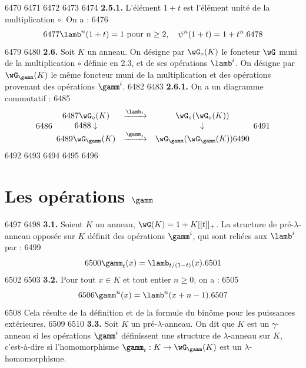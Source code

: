   6470	
  6471	%
  6472	%
  6473	%
  6474		\noindent\textbf{2.5.1.} L'\'el\'ement $1 + t$ est l'\'el\'ement unit\'e de la multiplication $\circ$. On a :
  6476	\begin{equation}
  6477	\lamb^n(1 + t) = 1 \text{ pour } n \geq 2, \quad \psi^n(1+t) = 1 + t^n.
  6478	\end{equation}
  6479	
  6480		\noindent\textbf{2.6.} Soit $K$ un anneau. On d\'esigne par $\wG_\circ(K)$ le foncteur $\wG$ muni de la multiplication $\circ$ d\'efinie en 2.3, et de ses op\'erations $\lamb^i$. On d\'esigne par $\wG_\gamm(K)$ le m\^eme foncteur muni de la multiplication et des op\'erations provenant des op\'erations $\gamm^i$.
  6482	
  6483		\noindent\textbf{2.6.1.} On a un diagramme commutatif :
  6485	\[
  6486	\begin{array}{ccc}
  6487	\wG_\circ(K) & \xrightarrow{\lamb_t} & \wG_\circ(\wG_\circ(K)) \\
  6488	\downarrow & & \downarrow \\
  6489	\wG_\gamm(K) & \xrightarrow{\gamm_t} & \wG_\gamm(\wG_\gamm(K))
  6490	\end{array}
  6491	\]
  6492	
  6493	%
  6494	%
  6495	%
  6496	\section{Les op\'erations $\gamm$}
  6497	
  6498	\noindent\textbf{3.1.} Soient $K$ un anneau, $\wG(K) = 1 + K[[t]]_+$. La structure de pr\'e-$\lambda$-anneau oppos\'ee sur $K$ d\'efinit des op\'erations $\gamm^i$, qui sont reli\'ees aux $\lamb^i$ par :
  6499	\begin{equation}
  6500	\gamm_t(x) = \lamb_{t/(1-t)}(x).
  6501	\end{equation}
  6502	
  6503		\noindent\textbf{3.2.} Pour tout $x \in K$ et tout entier $n \geq 0$, on a :
  6505	\begin{equation}
  6506	\gamm^n(x) = \lamb^n(x + n - 1).
  6507	\end{equation}
  6508	Cela r\'esulte de la d\'efinition et de la formule du bin\^ome pour les puissances ext\'erieures.
  6509	
  6510		\noindent\textbf{3.3.} Soit $K$ un pr\'e-$\lambda$-anneau. On dit que $K$ est un $\gamma$-anneau si les op\'erations $\gamm^i$ d\'efinissent une structure de $\lambda$-anneau sur $K$, c'est-\`a-dire si l'homomorphisme $\gamm_t : K \to \wG_\gamm(K)$ est un $\lambda$-homomorphisme.
